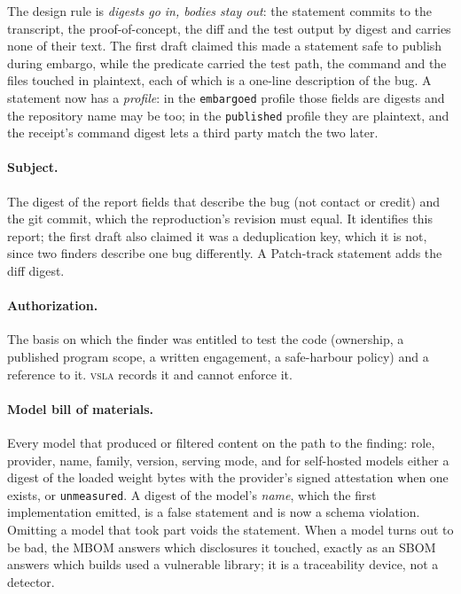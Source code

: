 \documentclass[11pt]{article}
\newcommand{\vsla}{\textsc{vsla}}
\begin{document}
The design rule is \emph{digests go in, bodies stay out}: the statement commits to the transcript, the
proof-of-concept, the diff and the test output by digest and carries none of their text. The first draft
claimed this made a statement safe to publish during embargo, while the predicate carried the test path, the
command and the files touched in plaintext, each of which is a one-line description of the bug. A statement
now has a \emph{profile}: in the \texttt{embargoed} profile those fields are digests and the repository name
may be too; in the \texttt{published} profile they are plaintext, and the receipt's command digest lets a third
party match the two later.

\paragraph{Subject.} The digest of the report fields that describe the bug (not contact or credit) and the
git commit, which the reproduction's revision must equal. It identifies this report; the first draft also
claimed it was a deduplication key, which it is not, since two finders describe one bug differently.
A Patch-track statement adds the diff digest.

\paragraph{Authorization.} The basis on which the finder was entitled to test the code (ownership, a published
program scope, a written engagement, a safe-harbour policy) and a reference to it. \vsla{} records it and
cannot enforce it.

\paragraph{Model bill of materials.} Every model that produced or filtered content on the path to the
finding: role, provider, name, family, version, serving mode, and for self-hosted models either a digest of the
loaded weight bytes with the provider's signed attestation when one exists, or \texttt{unmeasured}. A digest of
the model's \emph{name}, which the first implementation emitted, is a false statement and is now a schema
violation. Omitting a model that took part voids the statement. When a model turns out to be bad, the MBOM
answers which disclosures it touched, exactly as an SBOM answers which builds used a vulnerable library; it is
a traceability device, not a detector.
\end{document}
